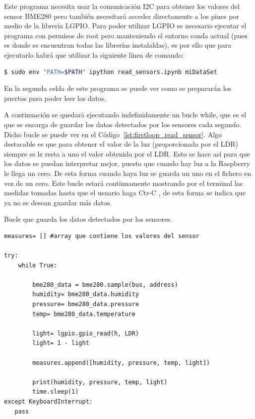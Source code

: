 \documentclass[a4paper, 12pt]{book}
\begin{document}
Este programa necesita usar la comunicación I2C para obtener los valores del sensor BME280 pero también necesitará acceder directamente a los pines por medio de la librería LGPIO. Para poder utilizar LGPIO es necesario ejecutar el programa con permisos de root pero manteniendo el entorno conda actual (pues es donde se encuentran todas las librerías instalaldas), es por ello que para ejecutarlo habrá que utilizar la siguiente línea de comando:  


\begin{lstlisting}[language=bash]
    $ sudo env "PATH=$PATH" ipython read_sensors.ipynb miDataSet
\end{lstlisting}

En la segunda celda de este programa se puede ver como se prepararán los puertos para poder leer los datos. 

A continuación se quedará ejecutando indefinidamente un bucle while, que es el que se encarga de guardar los datos detectados por los sensores cada segundo. Dicho bucle se puede ver en el Código~\ref{lst:firstloop_read_sensor}. Algo destacable es que para obtener el valor de la luz (proporcionada por el LDR) siempre se le resta a uno el valor obtenido por el LDR. Esto se hace así para que los datos se puedan interpretar mejor, puesto que cuando hay luz a la Raspberry le llega un cero. De esta forma cuando haya luz se guarda un uno en el fichero en vez de un cero. 
Este bucle estará continuamente mostrando por el terminal las medidas tomadas hasta que el usuario haga Ctr-C , de esta forma se indica que ya no se desean guardar más datos.

\begin{listing}[]
    \caption{Bucle que guarda los datos detectados por los sensores.}{}
    \label{lst:firstloop_read_sensor}
    \begin{verbatim}
measures= [] #array que contiene los valores del sensor

try:
    while True:

        bme280_data = bme280.sample(bus, address)
        humidity= bme280_data.humidity
        pressure= bme280_data.pressure
        temp= bme280_data.temperature
        
        light= lgpio.gpio_read(h, LDR)
        light= 1 - light
        
        measures.append([humidity, pressure, temp, light])
        
        print(humidity, pressure, temp, light)
        time.sleep(1)
except KeyboardInterrupt:
   pass  
    \end{verbatim}
\end{listing}
\end{document}
